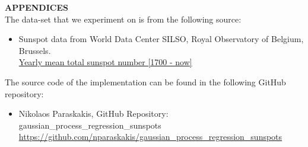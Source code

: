 \documentclass[12pt,a4paper]{article}
\newcommand{\boldmark}[1]{\noindent\textbf{#1}\\ }
\begin{document}
\sectionmark{}
\noindent
\boldmark{\Large{{\color{crimsonglory}APPENDICES}}}

\noindent
The data-set that we experiment on is from the following source:
\begin{itemize}
    \item Sunspot data from World Data Center SILSO, Royal Observatory of Belgium, Brussels.\\ \href{https://www.sidc.be/silso/datafiles}{{\color{blue}Yearly mean total sunspot number [1700 - now]}}
\end{itemize}
The source code of the implementation can be found in the following GitHub repository:
\begin{itemize}
    \item Nikolaos Paraskakis, GitHub Repository: gaussian\_process\_regression\_sunspots\\ \url{https://github.com/nparaskakis/gaussian_process_regression_sunspots}
\end{itemize}
\end{document}
